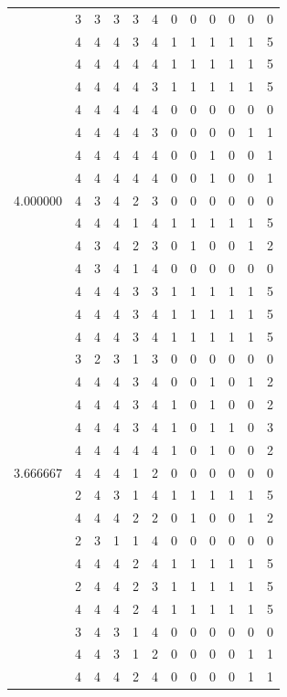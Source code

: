 \documentclass[]{book}
\theoremstyle{definition}
\theoremstyle{definition}
\theoremstyle{definition}
\theoremstyle{remark}
\begin{document}
\begin{table}
{\begin{tabular}[t]{rrrrrrrrrrrr}
 & 3 & 3 & 3 & 3 & 4 & 0 & 0 & 0 & 0 & 0 & 0\\
 & 4 & 4 & 4 & 3 & 4 & 1 & 1 & 1 & 1 & 1 & 5\\
 & 4 & 4 & 4 & 4 & 4 & 1 & 1 & 1 & 1 & 1 & 5\\
 & 4 & 4 & 4 & 4 & 3 & 1 & 1 & 1 & 1 & 1 & 5\\
 & 4 & 4 & 4 & 4 & 4 & 0 & 0 & 0 & 0 & 0 & 0\\
 & 4 & 4 & 4 & 4 & 3 & 0 & 0 & 0 & 0 & 1 & 1\\
 & 4 & 4 & 4 & 4 & 4 & 0 & 0 & 1 & 0 & 0 & 1\\
 & 4 & 4 & 4 & 4 & 4 & 0 & 0 & 1 & 0 & 0 & 1\\
4.000000 & 4 & 3 & 4 & 2 & 3 & 0 & 0 & 0 & 0 & 0 & 0\\
 & 4 & 4 & 4 & 1 & 4 & 1 & 1 & 1 & 1 & 1 & 5\\
 & 4 & 3 & 4 & 2 & 3 & 0 & 1 & 0 & 0 & 1 & 2\\
 & 4 & 3 & 4 & 1 & 4 & 0 & 0 & 0 & 0 & 0 & 0\\
 & 4 & 4 & 4 & 3 & 3 & 1 & 1 & 1 & 1 & 1 & 5\\
 & 4 & 4 & 4 & 3 & 4 & 1 & 1 & 1 & 1 & 1 & 5\\
 & 4 & 4 & 4 & 3 & 4 & 1 & 1 & 1 & 1 & 1 & 5\\
 & 3 & 2 & 3 & 1 & 3 & 0 & 0 & 0 & 0 & 0 & 0\\
 & 4 & 4 & 4 & 3 & 4 & 0 & 0 & 1 & 0 & 1 & 2\\
 & 4 & 4 & 4 & 3 & 4 & 1 & 0 & 1 & 0 & 0 & 2\\
 & 4 & 4 & 4 & 3 & 4 & 1 & 0 & 1 & 1 & 0 & 3\\
 & 4 & 4 & 4 & 4 & 4 & 1 & 0 & 1 & 0 & 0 & 2\\
3.666667 & 4 & 4 & 4 & 1 & 2 & 0 & 0 & 0 & 0 & 0 & 0\\
 & 2 & 4 & 3 & 1 & 4 & 1 & 1 & 1 & 1 & 1 & 5\\
 & 4 & 4 & 4 & 2 & 2 & 0 & 1 & 0 & 0 & 1 & 2\\
 & 2 & 3 & 1 & 1 & 4 & 0 & 0 & 0 & 0 & 0 & 0\\
 & 4 & 4 & 4 & 2 & 4 & 1 & 1 & 1 & 1 & 1 & 5\\
 & 2 & 4 & 4 & 2 & 3 & 1 & 1 & 1 & 1 & 1 & 5\\
 & 4 & 4 & 4 & 2 & 4 & 1 & 1 & 1 & 1 & 1 & 5\\
 & 3 & 4 & 3 & 1 & 4 & 0 & 0 & 0 & 0 & 0 & 0\\
 & 4 & 4 & 3 & 1 & 2 & 0 & 0 & 0 & 0 & 1 & 1\\
 & 4 & 4 & 4 & 2 & 4 & 0 & 0 & 0 & 0 & 1 & 1\\

\end{tabular}}
\end{table}
\end{document}
